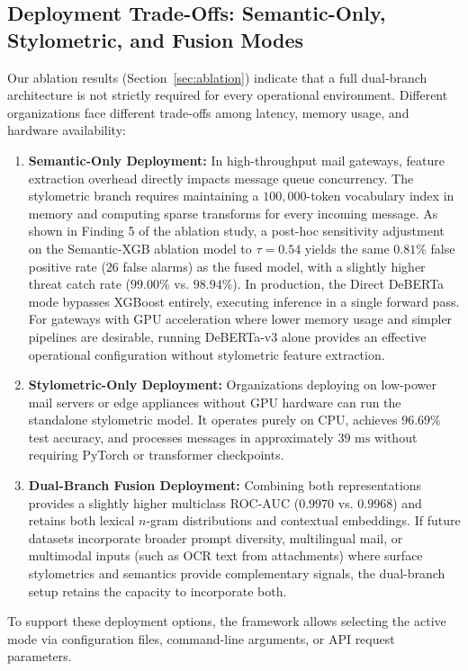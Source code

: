 \documentclass[journal]{IEEEtran}
\begin{document}
\subsection{Deployment Trade-Offs: Semantic-Only, Stylometric, and Fusion Modes}
Our ablation results (Section~\ref{sec:ablation}) indicate that a full dual-branch architecture is not strictly required for every operational environment. Different organizations face different trade-offs among latency, memory usage, and hardware availability:
\begin{enumerate}
    \item \textbf{Semantic-Only Deployment:} In high-throughput mail gateways, feature extraction overhead directly impacts message queue concurrency. The stylometric branch requires maintaining a $100{,}000$-token vocabulary index in memory and computing sparse transforms for every incoming message. As shown in Finding 5 of the ablation study, a post-hoc sensitivity adjustment on the Semantic-XGB ablation model to $\tau = 0.54$ yields the same $0.81\%$ false positive rate ($26$ false alarms) as the fused model, with a slightly higher threat catch rate ($99.00\%$ vs. $98.94\%$). In production, the Direct DeBERTa mode bypasses XGBoost entirely, executing inference in a single forward pass. For gateways with GPU acceleration where lower memory usage and simpler pipelines are desirable, running DeBERTa-v3 alone provides an effective operational configuration without stylometric feature extraction.
    \item \textbf{Stylometric-Only Deployment:} Organizations deploying on low-power mail servers or edge appliances without GPU hardware can run the standalone stylometric model. It operates purely on CPU, achieves $96.69\%$ test accuracy, and processes messages in approximately $39\text{ ms}$ without requiring PyTorch or transformer checkpoints.
    \item \textbf{Dual-Branch Fusion Deployment:} Combining both representations provides a slightly higher multiclass ROC-AUC ($0.9970$ vs. $0.9968$) and retains both lexical $n$-gram distributions and contextual embeddings. If future datasets incorporate broader prompt diversity, multilingual mail, or multimodal inputs (such as OCR text from attachments) where surface stylometrics and semantics provide complementary signals, the dual-branch setup retains the capacity to incorporate both.
\end{enumerate}
To support these deployment options, the framework allows selecting the active mode via configuration files, command-line arguments, or API request parameters.
\end{document}
